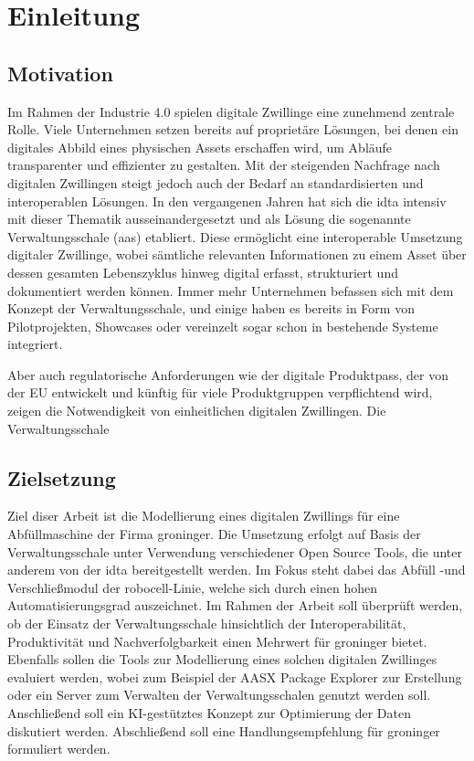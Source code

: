 \section{Einleitung}
\subsection{Motivation}
\label{sec:Motivation}
Im Rahmen der Industrie 4.0 spielen digitale Zwillinge eine zunehmend zentrale Rolle. 
Viele Unternehmen setzen bereits auf proprietäre Lösungen, bei denen ein digitales Abbild eines physischen Assets erschaffen wird, um Abläufe transparenter und effizienter zu gestalten. 
Mit der steigenden Nachfrage nach digitalen Zwillingen steigt jedoch auch der Bedarf an standardisierten und interoperablen Lösungen.
In den vergangenen Jahren hat sich die \ac{idta} intensiv mit dieser Thematik ausseinandergesetzt und als Lösung die sogenannte Verwaltungsschale (\ac{aas}) etabliert.
Diese ermöglicht eine interoperable Umsetzung digitaler Zwillinge, wobei sämtliche relevanten Informationen zu einem Asset über dessen gesamten Lebenszyklus hinweg digital erfasst, strukturiert und dokumentiert werden können. 
Immer mehr Unternehmen befassen sich mit dem Konzept der Verwaltungsschale, und einige haben es bereits in Form von Pilotprojekten, Showcases oder vereinzelt sogar schon in bestehende Systeme integriert.

Aber auch regulatorische Anforderungen wie der digitale Produktpass, der von der EU entwickelt und künftig für viele Produktgruppen verpflichtend wird, zeigen die Notwendigkeit von einheitlichen digitalen Zwillingen. 
Die Verwaltungsschale  
\subsection{Zielsetzung}
Ziel diser Arbeit ist die Modellierung eines digitalen Zwillings für eine Abfüllmaschine der Firma groninger.
Die Umsetzung erfolgt auf Basis der Verwaltungsschale unter Verwendung verschiedener Open Source Tools, die unter anderem von der \acs{idta} bereitgestellt werden. 
Im Fokus steht dabei das Abfüll -und Verschließmodul der robocell-Linie, welche sich durch einen hohen Automatisierungsgrad auszeichnet.
Im Rahmen der Arbeit soll überprüft werden, ob der Einsatz der Verwaltungsschale hinsichtlich der Interoperabilität, Produktivität und Nachverfolgbarkeit einen Mehrwert für groninger bietet.
Ebenfalls sollen die Tools zur Modellierung eines solchen digitalen Zwillinges evaluiert werden, wobei zum Beispiel der AASX Package Explorer zur Erstellung oder ein Server zum Verwalten der Verwaltungsschalen genutzt werden soll.
Anschließend soll ein KI-gestütztes Konzept zur Optimierung der Daten diskutiert werden.
Abschließend soll eine Handlungsempfehlung für groninger formuliert werden.
